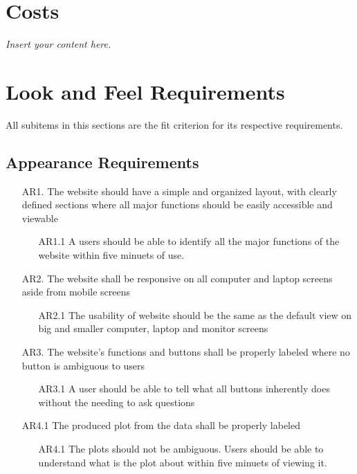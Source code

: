\documentclass[12pt]{article}
\newcommand{\lips}{\textit{Insert your content here.}}
\begin{document}
\section{Costs}
\lips
\section{Look and Feel Requirements}
All subitems in this sections are the fit criterion for its respective requirements. 
\subsection{Appearance Requirements}
\begin{itemize}
  \item [AR1.]The website should have a simple and organized layout, with
  clearly defined sections where all major functions should be easily accessible
  and viewable 
  \begin{itemize}
    \item[AR1.1] A users should be able to identify all the major
    functions of the website within five minuets of use.
  \end{itemize}
  \item [AR2.] The website shall be responsive on all computer and laptop screens
  aside from mobile screens
  \begin{itemize}
    \item [AR2.1] The usability of website should be the same
    as the default view on big and smaller computer, laptop and monitor screens
  \end{itemize}
  \item [AR3.] The website's functions and buttons shall be properly labeled
  where no button is ambiguous to users 
  \begin{itemize}
    \item [AR3.1] A user should be able to tell what all buttons inherently does
    without the needing to ask questions
  \end{itemize}
  \item [AR4.1]The produced plot from the data shall be properly labeled
  \begin{itemize}
    \item [AR4.1] The plots should not be ambiguous. Users should be able to understand
    what is the plot about within five minuets of viewing it.
  \end{itemize}
  \subitem
\end{itemize}
\end{document}
